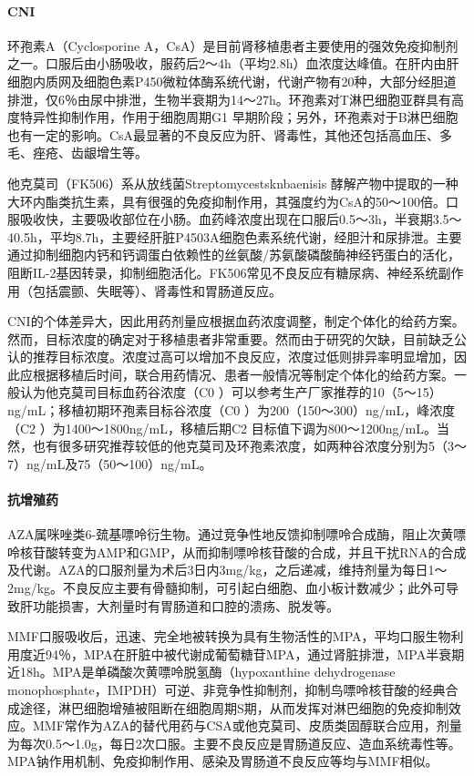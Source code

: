 \paragraph{CNI}

环孢素A（Cyclosporine
A，CsA）是目前肾移植患者主要使用的强效免疫抑制剂之一。口服后由小肠吸收，服药后2～4h（平均2.8h）血浓度达峰值。在肝内由肝细胞内质网及细胞色素P450微粒体酶系统代谢，代谢产物有20种，大部分经胆道排泄，仅6％由尿中排泄，生物半衰期为14～27h。环孢素对T淋巴细胞亚群具有高度特异性抑制作用，作用于细胞周期G{1}
早期阶段；另外，环孢素对于B淋巴细胞也有一定的影响。CsA最显著的不良反应为肝、肾毒性，其他还包括高血压、多毛、痤疮、齿龈增生等。

他克莫司（FK506）系从放线菌{Streptomycestsknbaenisis}
酵解产物中提取的一种大环内酯类抗生素，具有很强的免疫抑制作用，其强度约为CsA的50～100倍。口服吸收快，主要吸收部位在小肠。血药峰浓度出现在口服后0.5～3h，半衰期3.5～40.5h，平均8.7h，主要经肝脏P4503A细胞色素系统代谢，经胆汁和尿排泄。主要通过抑制细胞内钙和钙调蛋白依赖性的丝氨酸/苏氨酸磷酸酶神经钙蛋白的活化，阻断IL-2基因转录，抑制细胞活化。FK506常见不良反应有糖尿病、神经系统副作用（包括震颤、失眠等）、肾毒性和胃肠道反应。

CNI的个体差异大，因此用药剂量应根据血药浓度调整，制定个体化的给药方案。然而，目标浓度的确定对于移植患者非常重要。然而由于研究的欠缺，目前缺乏公认的推荐目标浓度。浓度过高可以增加不良反应，浓度过低则排异率明显增加，因此应根据移植后时间，联合用药情况、患者一般情况等制定个体化的给药方案。一般认为他克莫司目标血药谷浓度（C{0}
）可以参考生产厂家推荐的10（5～15）ng/mL；移植初期环孢素目标谷浓度（C{0}
）为200（150～300）ng/mL，峰浓度（C{2} ）为1400～1800ng/mL，移植后期C{2}
目标值下调为800～1200ng/mL。当然，也有很多研究推荐较低的他克莫司及环孢素浓度，如两种谷浓度分别为5（3～7）ng/mL及75（50～100）ng/mL。
\paragraph{抗增殖药}

AZA属咪唑类6-巯基嘌呤衍生物。通过竞争性地反馈抑制嘌呤合成酶，阻止次黄嘌呤核苷酸转变为AMP和GMP，从而抑制嘌呤核苷酸的合成，并且干扰RNA的合成及代谢。AZA的口服剂量为术后3日内3mg/kg，之后递减，维持剂量为每日1～2mg/kg。不良反应主要有骨髓抑制，可引起白细胞、血小板计数减少；此外可导致肝功能损害，大剂量时有胃肠道和口腔的溃疡、脱发等。

MMF口服吸收后，迅速、完全地被转换为具有生物活性的MPA，平均口服生物利用度近94％，MPA在肝脏中被代谢成葡萄糖苷MPA，通过肾脏排泄，MPA半衰期近18h。MPA是单磷酸次黄嘌呤脱氢酶（hypoxanthine
dehydrogenase
monophosphate，IMPDH）可逆、非竞争性抑制剂，抑制鸟嘌呤核苷酸的经典合成途径，淋巴细胞增殖被阻断在细胞周期S期，从而发挥对淋巴细胞的免疫抑制效应。MMF常作为AZA的替代用药与CSA或他克莫司、皮质类固醇联合应用，剂量为每次0.5～1.0g，每日2次口服。主要不良反应是胃肠道反应、造血系统毒性等。MPA钠作用机制、免疫抑制作用、感染及胃肠道不良反应等均与MMF相似。
